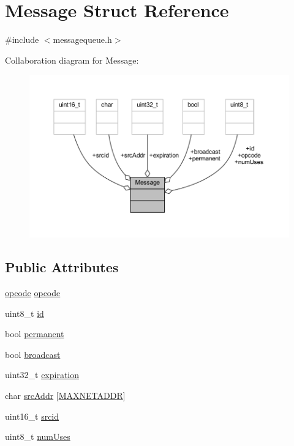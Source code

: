 \hypertarget{struct_message}{}\section{Message Struct Reference}
\label{struct_message}


{\ttfamily \#include $<$messagequeue.\+h$>$}



Collaboration diagram for Message\+:\nopagebreak
\begin{figure}[H]
\begin{center}
\leavevmode
\includegraphics[width=350pt]{struct_message__coll__graph}
\end{center}
\end{figure}
\subsection*{Public Attributes}
\begin{DoxyCompactItemize}
\item 
\hyperlink{haha_utils_8h_a5ce68aceddf17a30aa045fc04914e798}{opcode} \hyperlink{struct_message_a1b33863bc276c3766459cb2199492c89}{opcode}
\item 
uint8\+\_\+t \hyperlink{struct_message_ae61f86cd0691a3f02faa414da330a780}{id}
\item 
bool \hyperlink{struct_message_a68480c18c3f3c0795af5200914696b33}{permanent}
\item 
bool \hyperlink{struct_message_a9760ef38e390bc0be29b4e0add01fd7c}{broadcast}
\item 
uint32\+\_\+t \hyperlink{struct_message_af4f9c907b7851f2a4f7ed8156b8b4966}{expiration}
\item 
char \hyperlink{struct_message_a012f65c4847cc68c06ca5630b6652e0b}{src\+Addr} \mbox{[}\hyperlink{haha_utils_8h_a64e48eb75238bd3d7a053f19071044a8}{M\+A\+X\+N\+E\+T\+A\+D\+DR}\mbox{]}
\item 
uint16\+\_\+t \hyperlink{struct_message_a58696ceb3c9b42f0647843f2c4934d8f}{srcid}
\item 
uint8\+\_\+t \hyperlink{struct_message_a37d723043c8f623a2294306e9dd42425}{num\+Uses}
\end{DoxyCompactItemize}



